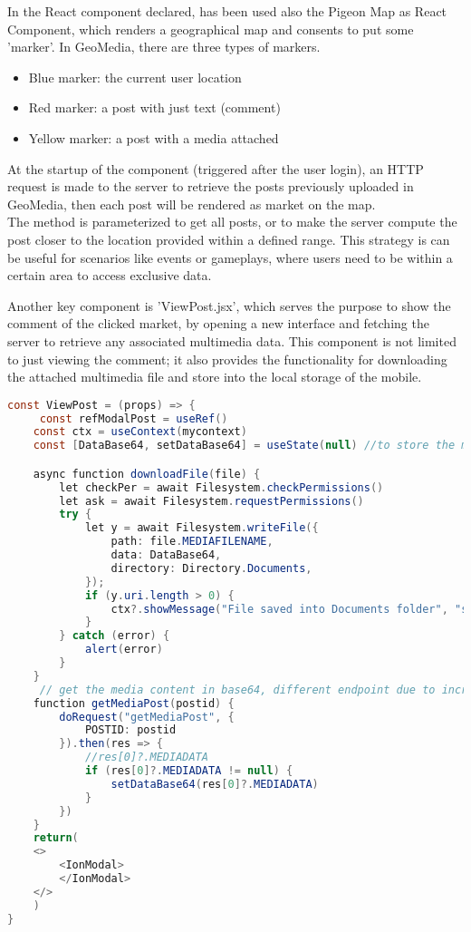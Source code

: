 \documentclass[conference]{IEEEtran}
\begin{document}
In the React component declared, has been used also the Pigeon Map as React Component, which renders a geographical map and consents to put some 'marker'.
In GeoMedia, there are three types of markers.
\begin{itemize}
\item Blue marker: the current user location
\item Red marker: a post with just text (comment)
\item Yellow marker: a post with a media attached 
\end{itemize}

At the startup of the component (triggered after the user login), an HTTP request is made to the server to retrieve the posts previously uploaded in GeoMedia, then each post will be rendered as market on the map.
\\
The method is parameterized to get all posts, or to make the server compute the post closer to the location provided within a defined range.
This strategy is can be useful for scenarios like events or gameplays, where users need to be  within a certain area to access exclusive data.


Another key component is 'ViewPost.jsx', which serves the purpose to show the comment of the clicked market, by opening a new interface and fetching the server to retrieve any associated multimedia data.
This component is not limited to just viewing the comment; it also provides the functionality for downloading the attached multimedia file and store into the local storage of the mobile.

\begin{lstlisting}[language=Java, caption=ViewPost]
const ViewPost = (props) => {
     const refModalPost = useRef()
    const ctx = useContext(mycontext)
    const [DataBase64, setDataBase64] = useState(null) //to store the mediafile attached

    async function downloadFile(file) {
        let checkPer = await Filesystem.checkPermissions()
        let ask = await Filesystem.requestPermissions()
        try {
            let y = await Filesystem.writeFile({
                path: file.MEDIAFILENAME,
                data: DataBase64,
                directory: Directory.Documents,
            });
            if (y.uri.length > 0) {
                ctx?.showMessage("File saved into Documents folder", "success")
            }
        } catch (error) {
            alert(error)
        }
    }
     // get the media content in base64, different endpoint due to increment performance
    function getMediaPost(postid) {
        doRequest("getMediaPost", {
            POSTID: postid
        }).then(res => {
            //res[0]?.MEDIADATA
            if (res[0]?.MEDIADATA != null) {
                setDataBase64(res[0]?.MEDIADATA)
            }
        })
    }
    return(
    <>
        <IonModal>
        </IonModal>
    </>
    )
}
\end{lstlisting}
\end{document}
